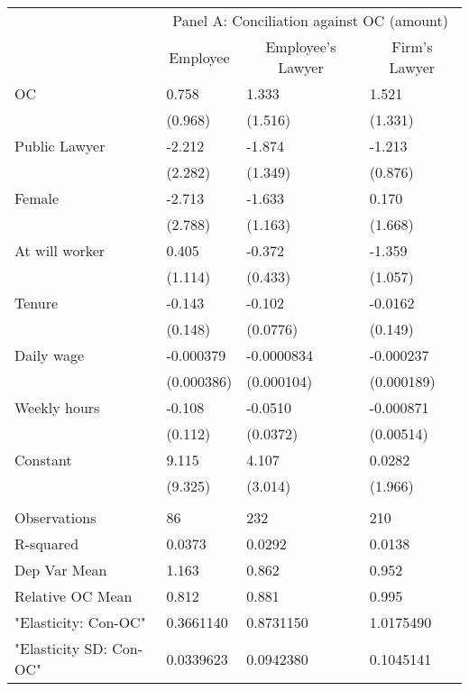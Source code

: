 \begin{tabular}{llll}
      & \multicolumn{3}{c}{Panel A: Conciliation against OC (amount)} \\
\cmidrule{2-4}      & \multicolumn{1}{c}{Employee} & \multicolumn{1}{c}{Employee's Lawyer} & \multicolumn{1}{c}{Firm's Lawyer} \\
\cmidrule{2-4}OC    & 0.758 & 1.333 & 1.521 \\
      & (0.968) & (1.516) & (1.331) \\
Public Lawyer & -2.212 & -1.874 & -1.213 \\
      & (2.282) & (1.349) & (0.876) \\
Female & -2.713 & -1.633 & 0.170 \\
      & (2.788) & (1.163) & (1.668) \\
At will worker & 0.405 & -0.372 & -1.359 \\
      & (1.114) & (0.433) & (1.057) \\
Tenure & -0.143 & -0.102 & -0.0162 \\
      & (0.148) & (0.0776) & (0.149) \\
Daily wage & -0.000379 & -0.0000834 & -0.000237 \\
      & (0.000386) & (0.000104) & (0.000189) \\
Weekly hours & -0.108 & -0.0510 & -0.000871 \\
      & (0.112) & (0.0372) & (0.00514) \\
Constant & 9.115 & 4.107 & 0.0282 \\
      & (9.325) & (3.014) & (1.966) \\
      &       &       &  \\
\midrule
Observations & 86    & 232   & 210 \\
R-squared & 0.0373 & 0.0292 & 0.0138 \\
Dep Var Mean & 1.163 & 0.862 & 0.952 \\
Relative OC Mean & 0.812 & 0.881 & 0.995 \\
"Elasticity: Con-OC" & 0.3661140 & 0.8731150 & 1.0175490 \\
"Elasticity SD: Con-OC" & 0.0339623 & 0.0942380 & 0.1045141 \\
\bottomrule
\end{tabular}%
